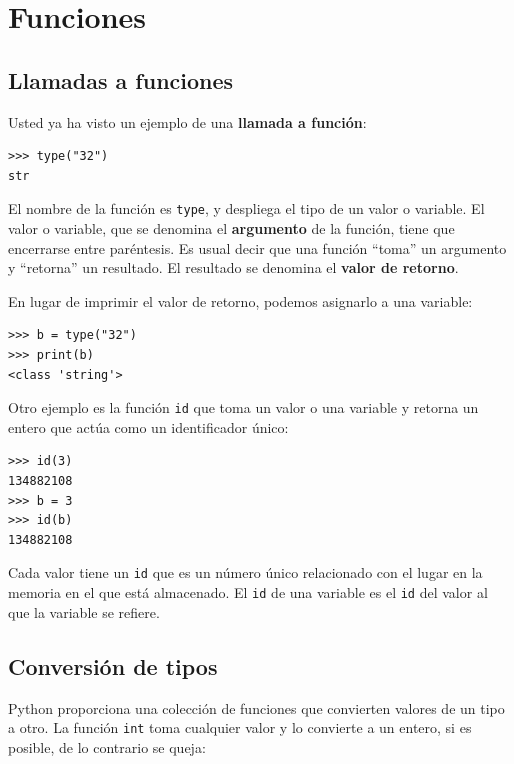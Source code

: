 
\chapter{Funciones }

\label{floatchap}

\section{Llamadas a funciones}

\label{functionchap}  

Usted ya ha visto un ejemplo de una \textbf{llamada a función}:

\begin{verbatim}
>>> type("32")
str
\end{verbatim}

El nombre de la función es \texttt{type}, y despliega el tipo de un
valor o variable. El valor o variable, que se denomina el \textbf{argumento}
de la función, tiene que encerrarse entre paréntesis. Es usual decir
que una función ``toma'' un argumento y ``retorna'' un resultado.
El resultado se denomina el \textbf{valor de retorno}.

 

En lugar de imprimir el valor de retorno, podemos asignarlo a una
variable:

\begin{verbatim}
>>> b = type("32")
>>> print(b)
<class 'string'>
\end{verbatim}
 

Otro ejemplo es la función \texttt{id} que toma un valor o una variable
y retorna un entero que actúa como un identificador único:

\begin{verbatim}
>>> id(3)
134882108
>>> b = 3
>>> id(b)
134882108
\end{verbatim}
 Cada valor tiene un \texttt{id} que es un número único relacionado
con el lugar en la memoria en el que está almacenado. El \texttt{id}
de una variable es el \texttt{id} del valor al que la variable se
refiere.

\section{Conversión de tipos}

 

Python proporciona una colección de funciones que convierten valores
de un tipo a otro. La función \texttt{int} toma cualquier valor y
lo convierte a un entero, si es posible, de lo contrario se queja:

